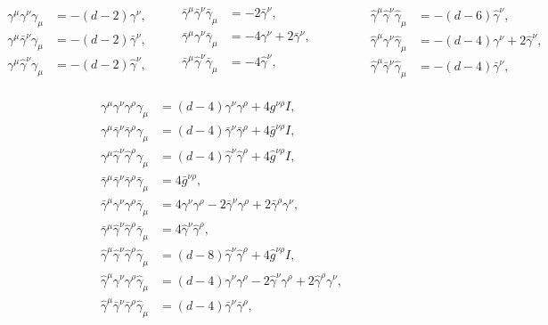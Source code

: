 \documentclass[../FeynCalcManual.tex]{subfiles}
\begin{document}
\begin{align}
\begin{split}
\gamma^\mu \gamma^\nu \gamma_\mu &= -(d-2) \gamma^\nu, \\
\gamma^\mu \bar{\gamma}^\nu \gamma_\mu &= -(d-2) \bar{\gamma}^\nu, \\
\gamma^\mu \hat{\gamma}^\nu \gamma_\mu &= -(d-2) \hat{\gamma}^\nu,
\end{split} \quad \quad 
\begin{split}
\bar{\gamma}^\mu \bar{\gamma}^\nu \bar{\gamma}_\mu &= -2 \bar{\gamma}^\nu, \\
\bar{\gamma}^\mu \gamma^\nu \bar{\gamma}_\mu &= -4 \gamma^\nu +2 \bar{\gamma}^\nu, \\
\bar{\gamma}^\mu \hat{\gamma}^\nu \bar{\gamma}_\mu &= -4 \hat{\gamma}^\nu, \\
\end{split} \quad \quad \quad \quad 
\begin{split}
\hat{\gamma}^\mu \hat{\gamma}^\nu \hat{\gamma}_\mu &= -(d-6) \hat{\gamma}^\nu, \\
\hat{\gamma}^\mu \gamma^\nu \hat{\gamma}_\mu &= -(d-4) \gamma^\nu + 2\hat{\gamma}^\nu, \\
\hat{\gamma}^\mu \bar{\gamma}^\nu \hat{\gamma}_\mu &= -(d-4) \bar{\gamma}^\nu,
\end{split}
\end{align}

\begin{align}
\gamma^\mu \gamma^\nu \gamma^\rho \gamma_\mu &= (d-4) \gamma^\nu \gamma^\rho + 4 g^{\nu \rho} I, \\
\gamma^\mu \bar{\gamma}^\nu \bar{\gamma}^\rho \gamma_\mu &= (d-4) \bar{\gamma}^\nu \bar{\gamma}^\rho + 4 \bar{g}^{\nu \rho} I, \\
\gamma^\mu \hat{\gamma}^\nu \hat{\gamma}^\rho\gamma_\mu &= (d-4) \hat{\gamma}^\nu \hat{\gamma}^\rho + 4 \hat{g}^{\nu \rho} I, \\
\bar{\gamma}^\mu \bar{\gamma}^\nu \bar{\gamma}^\rho \bar{\gamma}_\mu &= 4 \bar{g}^{\nu \rho}, \\
\bar{\gamma}^\mu \gamma^\nu \gamma^\rho \bar{\gamma}_\mu &= 4 \gamma^\nu \gamma^\rho - 2 \bar{\gamma}^\nu \gamma^\rho + 2\bar{\gamma}^\rho
 \gamma^\nu, \\
\bar{\gamma}^\mu \hat{\gamma}^\nu \hat{\gamma}^\rho \bar{\gamma}_\mu &= 4 \hat{\gamma}^\nu \hat{\gamma}^\rho, \\
\hat{\gamma}^\mu \hat{\gamma}^\nu \hat{\gamma}^\rho \hat{\gamma}_\mu &= (d-8) \hat{\gamma}^\nu \hat{\gamma}^\rho + 4 \hat{g}^{\nu \rho} I, \\
\hat{\gamma}^\mu \gamma^\nu \gamma^\rho \hat{\gamma}_\mu &= (d-4) \gamma^\nu \gamma^\rho - 2 \hat{\gamma}^\nu \gamma^\rho + 2\hat{\gamma}^\rho \gamma^\nu, \\
\hat{\gamma}^\mu \bar{\gamma}^\nu \bar{\gamma}^\rho \hat{\gamma}_\mu &= (d-4) \bar{\gamma}^\nu \bar{\gamma}^\rho,
\end{align}
\end{document}
